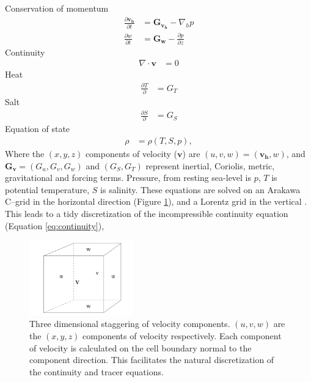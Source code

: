 Conservation of momentum
\begin{align}
    \frac{\partial \mathbf{v_h}}{\partial t}  &= \mathbf{G_{v_h}} -  \nabla_h p \label{eq:momentum}\\
    \frac{\partial w}{\partial t} &= \mathbf{G_w} - \frac{\partial p }{\partial z} \label{eq:momentum2}
\end{align}
Continuity
\begin{align}
    \nabla \cdot \mathbf{v} &= 0 \label{eq:continuity}
\end{align}
Heat
\begin{align}
    \frac{\partial T}{\partial} &= G_T
\end{align}
Salt
\begin{align}
    \frac{\partial S}{\partial} &= G_S 
\end{align}
Equation of state
\begin{align}
    \rho &= \rho(T,S, p),
\end{align}
Where the $(x,y,z)$ components of velocity  ($\mathbf{v}$) are  $(u,v,w) = (\mathbf{v_h},w) $, and $\mathbf{G_v} = (G_u,G_v,G_w)$ and $(G_S,G_T)$ represent inertial, Coriolis, metric, gravitational and forcing terms. Pressure, from resting sea-level is $p$, $T$ is potential temperature, $S$ is salinity.
These equations are solved on an Arakawa C--grid in the horizontal direction (Figure \ref{fig:c_grid}), and a Lorentz grid in the vertical \citep{adcroft1997representation}. This leads to a tidy discretization of the incompressible continuity equation (Equation \ref{eq:continuity}),

\begin{figure}[!ht]
\centering
\includegraphics[width=0.4\textwidth]{chapters/4/c_grid.png}
\caption[C--grid]{ Three dimensional staggering of velocity components. $(u, v, w)$ are the $(x,y,z)$ components of velocity respectively. Each component of velocity is calculated on the cell boundary normal to the component direction. This facilitates the natural discretization of the continuity and tracer equations.}
\label{fig:c_grid}
\end{figure}

